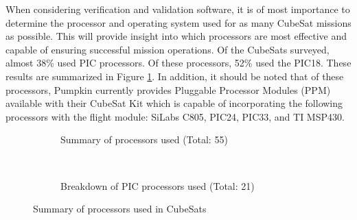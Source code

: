 \documentclass[11pt]{article}
\begin{document}
When considering verification and validation software, it is of most importance to determine the processor and operating system used for as many CubeSat missions as possible.  This will provide insight into which processors are most effective and capable of ensuring successful mission operations.  Of the CubeSats surveyed, almost 38\% used PIC processors.  Of these processors, 52\% used the PIC18.  These results are summarized in Figure \ref{processors}.  In addition, it should be noted that of these processors, Pumpkin currently provides Pluggable Processor Modules (PPM) available with their CubeSat Kit which is capable of incorporating the following processors with the flight module:  SiLabs C805, PIC24, PIC33, and TI MSP430.  

\begin{figure}[h!]
    \centering
    \begin{subfigure}[t]{0.5\textwidth}
        \centering
        \caption{Summary of processors used (Total: 55)}
    \end{subfigure}%
    ~ 
    \begin{subfigure}[t]{0.5\textwidth}
        \centering
        \caption{Breakdown of PIC processors used (Total: 21)}
    \end{subfigure}
    \caption{Summary of processors used in CubeSats}
		\label{processors}
\end{figure}
\end{document}
